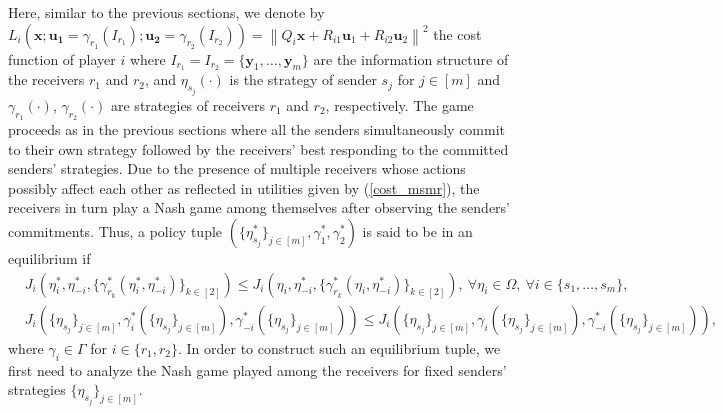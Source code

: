 \documentclass[12pt,journal,onecolumn]{IEEEtran}
\begin{document}
Here, similar to the previous sections, we denote by $L_i(\boldsymbol{x};\boldsymbol{u_1}=\gamma_{r_1}(I_{r_1});\boldsymbol{u_2}=\gamma_{r_2}(I_{r_2}))=\left\|Q_i\boldsymbol{x}+R_{i1}\boldsymbol{u}_1+R_{i2}\boldsymbol{u}_2\right\|^2$ the cost function of player $i$ where $I_{r_1} =I_{r_2} = \{\boldsymbol{y}_1,\hdots,\boldsymbol{y}_m\}$ are the information structure of the receivers $r_1$ and $r_2$, and $\eta_{s_j}(\cdot)$ is the strategy of sender $s_j$ for $j\in[m]$ and $\gamma_{r_1}(\cdot)$, $\gamma_{r_2}(\cdot)$ are strategies of receivers $r_1$ and $r_2$, respectively. The game proceeds as in the previous sections where all the senders simultaneously commit to their own strategy followed by the receivers' best responding to the committed senders' strategies. Due to the presence of multiple receivers whose actions possibly affect each other as reflected in utilities given by (\ref{cost_msmr}), %
the receivers in turn play a Nash game among themselves after observing the senders' commitments. Thus, a policy tuple $(\{\eta^*_{s_j}\}_{j\in[m]},\gamma_1^*, \gamma_2^*)$ is said to be in an equilibrium if
\begin{align}
    &J_i(\eta_i^*,\eta_{-i}^*,\!\{\gamma_{r_k}^*(\eta_i^*,\eta_{-i}^*)\}_{k\in[2]})\!\leq\! J_i(\eta_i,\eta_{-i}^*,\!\{\gamma_{r_k}^*(\eta_i,\eta_{-i}^*)\}_{k\in[2]}),~\forall\eta_i\in\Omega,~\forall i\in\{s_1,\hdots,s_m\},\!\!\\
    &J_i(\{\eta_{s_j}\}_{j\in[m]},\gamma_i^*(\{\eta_{s_j}\}_{j\in[m]}),\gamma_{-i}^*(\{\eta_{s_j}\}_{j\in[m]}))\leq J_i(\{\eta_{s_j}\}_{j\in[m]},\gamma_i(\{\eta_{s_j}\}_{j\in[m]}),\gamma_{-i}^*(\{\eta_{s_j}\}_{j\in[m]})),
\end{align}
where $\gamma_i\in\Gamma$ for $i\in\{r_1, r_2\}.$ In order to construct such an equilibrium tuple, we first need to analyze the Nash game played among the receivers for fixed senders' strategies $\{\eta_{s_j}\}_{j\in[m]}$. %
\end{document}
